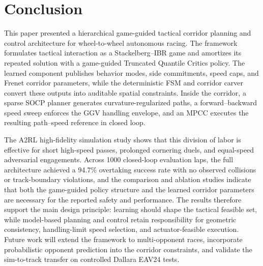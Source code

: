 \documentclass{iopjournal}
\begin{document}
\section{Conclusion}\label{sec:conclusion}
This paper presented a hierarchical game-guided tactical corridor planning and
control architecture for wheel-to-wheel autonomous racing.  The framework
formulates tactical interaction as a Stackelberg--IBR game and amortizes its
repeated solution with a game-guided Truncated Quantile Critics policy.  The
learned component publishes behavior modes, side commitments, speed caps, and
Frenet corridor parameters, while the deterministic FSM and corridor carver
convert these outputs into auditable spatial constraints.  Inside the corridor,
a sparse SOCP planner generates curvature-regularized paths, a
forward--backward speed sweep enforces the GGV handling envelope, and an MPCC
executes the resulting path--speed reference in closed loop.

The A2RL high-fidelity simulation study shows that this division of labor is
effective for short high-speed passes, prolonged cornering duels, and
equal-speed adversarial engagements.  Across 1000 closed-loop evaluation laps,
the full architecture achieved a 94.7\% overtaking success rate with no
observed collisions or track-boundary violations, and the comparison and
ablation studies indicate that both the game-guided policy structure and the
learned corridor parameters are necessary for the reported safety and
performance.  The results therefore support the main design principle: learning
should shape the tactical feasible set, while model-based planning and control
retain responsibility for geometric consistency, handling-limit speed
selection, and actuator-feasible execution.  Future work will extend the
framework to multi-opponent races, incorporate probabilistic opponent
prediction into the corridor constraints, and validate the sim-to-track
transfer on controlled Dallara EAV24 tests.


\end{document}
